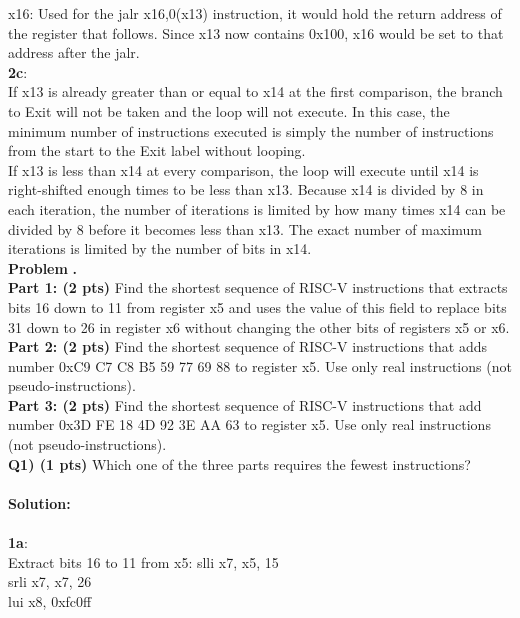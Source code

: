 \documentclass[11pt]{article}
\newcounter{problem}
\newcounter{solution}
\newcommand\Problem{%
	\stepcounter{problem}%
	\textbf{\theproblem.}~%
	\setcounter{solution}{0}%
}
\newcommand\TheSolution{%
	\textbf{Solution:}\\%
}
\begin{document}
	x16: Used for the jalr x16,0(x13) instruction, it would hold the return address of the register that follows. Since x13 now contains 0x100, x16 would be set to that address after the jalr.\\
	\textbf{2c}:\\
	If x13 is already greater than or equal to x14 at the first comparison, the branch to Exit will not be taken and the loop will not execute. In this case, the minimum number of instructions executed is simply the number of instructions from the start to the Exit label without looping.\\
	If x13 is less than x14 at every comparison, the loop will execute until x14 is right-shifted enough times to be less than x13. Because x14 is divided by 8 in each iteration, the number of iterations is limited by how many times x14 can be divided by 8 before it becomes less than x13. The exact number of maximum iterations is limited by the number of bits in x14.\\
	\textbf{Problem}
	\Problem{ \\
		\textbf{Part 1: (2 pts)} Find the shortest sequence of RISC-V instructions that extracts bits 16 down to 11 from register x5 and uses the value of this field to replace bits 31 down to 26 in register x6 without changing the other bits of registers x5 or x6.\\
		\textbf{Part 2: (2 pts)} Find the shortest sequence of RISC-V instructions that adds number 0xC9 C7 C8 B5 59 77 69 88 to register x5. Use only real instructions (not pseudo-instructions).\\
		\textbf{Part 3: (2 pts)} Find the shortest sequence of RISC-V instructions that add number 0x3D FE 18 4D 92 3E AA 63 to register x5. Use only real instructions (not pseudo-instructions).\\
		\indent \textbf{Q1) (1 pts)} Which one of the three parts requires the fewest instructions?\\
		}\\
	\TheSolution\\
	\textbf{1a}:\\
	    Extract bits 16 to 11 from x5:
	slli x7, x5, 15\\
	srli x7, x7, 26\\
	lui x8, 0xfc0ff\\
\end{document}
